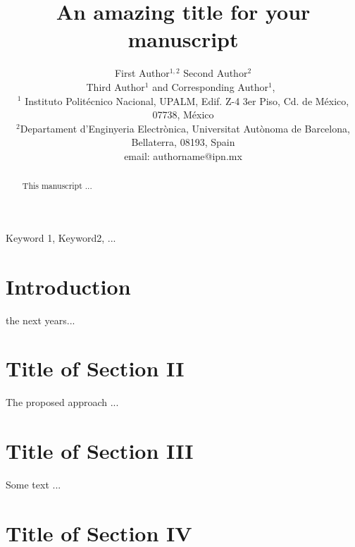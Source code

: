 \documentclass[journal]{IEEEtran}
\begin{document}
    \title{An amazing title for your manuscript}
  \author{First Author$^{1,2}$
      Second Author$^{2}$\\
      Third Author$^{1}$
      and Corresponding Author$^{1}$,~

$^1$ Instituto Polit\'ecnico Nacional, UPALM, Edif. Z-4 3er Piso, Cd. de M\'exico, 07738, M\'exico \\
$^2$Departament d’Enginyeria Electrònica, Universitat Autònoma de Barcelona, Bellaterra, 08193, Spain \\
email: authorname@ipn.mx
}
\maketitle

\begin{abstract}
This manuscript ...

\end{abstract}

\begin{IEEEkeywords}
Keyword 1, Keyword2, ...
\end{IEEEkeywords}

\section{Introduction}

 the next years...  \\


\section{Title of Section II}

The proposed approach ...

\section{Title of Section III}

Some text ...

\section{Title of Section IV}
\end{document}
